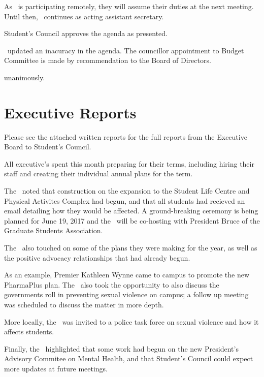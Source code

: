 \documentclass[12pt, letterpaper]{article}
\begin{document}
As \wenyu\ is participating remotely, they will assume their duties at the next
meeting. Until then, \jill\ continues as acting assistant secretary. 

\begin{motion}
    \birt Student's Council approves the agenda as presented. 
    \movers{\brian}{\jason}

    \brian\ updated an inacuracy in the agenda. The councillor appointment to
    Budget Committee is made by recommendation to the Board of Directors.

    \carries unanimously. 
\end{motion}

\section*{Executive Reports}

Please see the attached written reports for the full reports from the Executive
Board to Student's Council. 

All executive's spent this month preparing for their terms, including hiring 
their staff and creating their individual annual plans for the term.

\begin{information}

    The \pres\ noted that construction on the expansion to the Student Life
    Centre and Physical Activites Complex had begun, and that all students had
    recieved an email detailing how they would be affected. A ground-breaking
    ceremony is being planned for June 19, 2017 and the \pres\ will be 
    co-hosting with President Bruce of the Graduate Students Association. 
    
    The \pres\ also touched on some of the plans they were making for the year,
    as well as the positive advocacy relationships that had already begun. 

    As an example, Premier Kathleen Wynne came to campus to promote the new 
    PharmaPlus plan. The \pres\ also took the opportunity to also discuss the 
    governments roll in preventing sexual violence on campus; a follow up 
    meeting was scheduled to discuss the matter in more depth.

    More locally, the \pres\ was invited to a police task force on sexual 
    violence and how it affects students. 

    Finally, the \pres\ highlighted that some work had begun on the new
    President's Advisory Commitee on Mental Health, and that Student's Council 
    could expect more updates at future meetings. 

\end{information}
\end{document}
